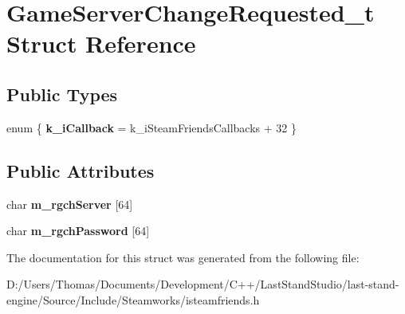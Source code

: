 \hypertarget{structGameServerChangeRequested__t}{}\section{Game\+Server\+Change\+Requested\+\_\+t Struct Reference}
\label{structGameServerChangeRequested__t}
\subsection*{Public Types}
\begin{DoxyCompactItemize}
\item 
\hypertarget{structGameServerChangeRequested__t_a1702b7948d287cd6d61e7049cd648264}{}enum \{ {\bfseries k\+\_\+i\+Callback} = k\+\_\+i\+Steam\+Friends\+Callbacks + 32
 \}\label{structGameServerChangeRequested__t_a1702b7948d287cd6d61e7049cd648264}

\end{DoxyCompactItemize}
\subsection*{Public Attributes}
\begin{DoxyCompactItemize}
\item 
\hypertarget{structGameServerChangeRequested__t_a665efa8b7a8b7d836540d05e605032e7}{}char {\bfseries m\+\_\+rgch\+Server} \mbox{[}64\mbox{]}\label{structGameServerChangeRequested__t_a665efa8b7a8b7d836540d05e605032e7}

\item 
\hypertarget{structGameServerChangeRequested__t_a1c9c2d3516c2e9d637883a4de55e800c}{}char {\bfseries m\+\_\+rgch\+Password} \mbox{[}64\mbox{]}\label{structGameServerChangeRequested__t_a1c9c2d3516c2e9d637883a4de55e800c}

\end{DoxyCompactItemize}


The documentation for this struct was generated from the following file\+:\begin{DoxyCompactItemize}
\item 
D\+:/\+Users/\+Thomas/\+Documents/\+Development/\+C++/\+Last\+Stand\+Studio/last-\/stand-\/engine/\+Source/\+Include/\+Steamworks/isteamfriends.\+h\end{DoxyCompactItemize}
